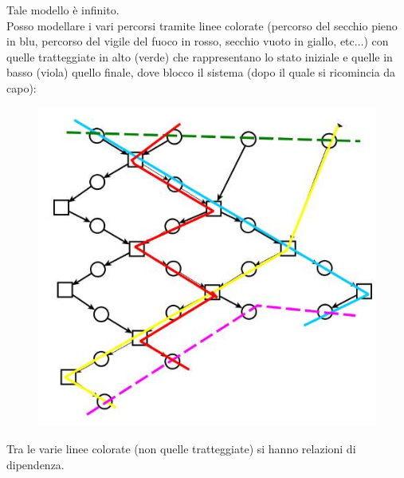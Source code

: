 Tale modello è infinito.\\
\newpage
Posso modellare i vari percorsi tramite linee colorate (percorso del secchio
pieno in blu, percorso del vigile del fuoco in rosso, secchio vuoto in giallo,
etc$\ldots$) con quelle tratteggiate 
in alto (verde) che rappresentano lo stato iniziale e quelle in basso (viola)
quello finale, dove blocco il sistema
(dopo il quale si ricomincia da capo):
\begin{figure}[H]
  \centering
  \includegraphics[scale = 0.5]{img/inc3.jpg} 
\end{figure}
Tra le varie linee colorate (non quelle tratteggiate) si hanno relazioni di
dipendenza. \\
